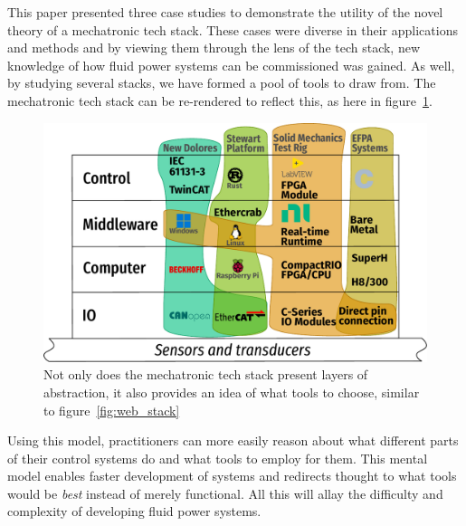 \documentclass[english,12pt,a4paper,pdftex,eng,utf8]{aaltothesis}
\begin{document}
This paper presented three case studies to demonstrate the utility of the novel theory of a mechatronic tech stack.  These cases were diverse in their applications and methods and by viewing them through the lens of the tech stack, new knowledge of how fluid power systems can be commissioned was gained.  As well, by studying several stacks, we have formed a pool of tools to draw from.  The mechatronic tech stack can be re-rendered to reflect this, as here in figure~\ref{fig:mechatronic_tech_stack_filled}.

\begin{figure}[h]
  \centering
  \includegraphics[width=\textwidth]{assets/mechatronic_tech_stack_filled}
  \caption{Not only does the mechatronic tech stack present layers of abstraction, it also provides an idea of what tools to choose, similar to figure~\ref{fig:web_stack}}\label{fig:mechatronic_tech_stack_filled}
\end{figure}

Using this model, practitioners can more easily reason about what different parts of their control systems do and what tools to employ for them.  This mental model enables faster development of systems and redirects thought to what tools would be {\it best\/} instead of merely functional.  All this will allay the difficulty and complexity of developing fluid power systems.

\clearpage

{}




\clearpage

\thesisappendix

\end{document}
